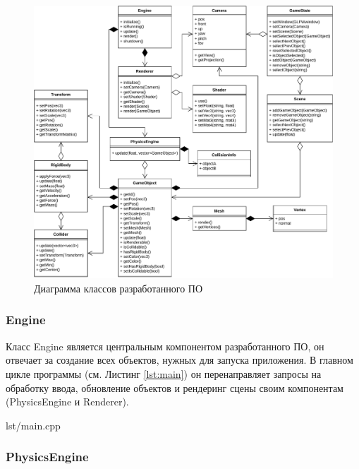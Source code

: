 \begin{figure}[H]
	\centering
	\includegraphics[width=\textwidth]{diag/uml.pdf}
	\caption{Диаграмма классов разработанного ПО}
	\label{fig:uml}
\end{figure}

\subsubsection*{Engine}

Класс Engine является центральным компонентом разработанного ПО, он отвечает за создание всех объектов, нужных для запуска приложения.
В главном цикле программы (см. Листинг \ref{lst:main}) он перенаправляет запросы на обработку ввода, обновление объектов и рендеринг сцены своим компонентам (PhysicsEngine и Renderer).

\begin{code}
    \begin{lstinputlisting}[
            label={lst:main},
            caption={Точка входа и главный цикл},
        ]{lst/main.cpp}
    \end{lstinputlisting}
\end{code}

\subsubsection*{PhysicsEngine}

